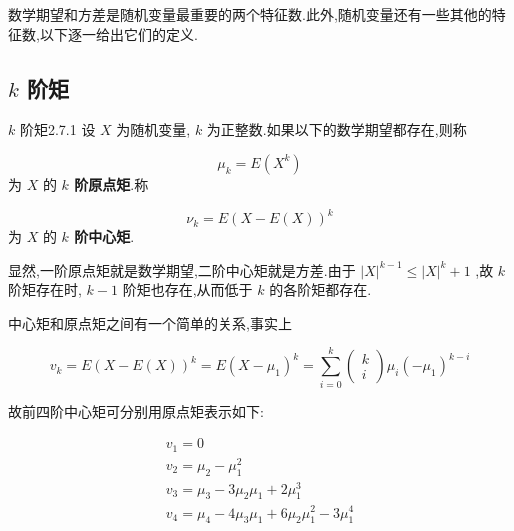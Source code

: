 数学期望和方差是随机变量最重要的两个特征数.此外,随机变量还有一些其他的特征数,以下逐一给出它们的定义.

\subsection{$ k $ 阶矩}\label{ssec:2.7.1}

\begin{definition}{$ k $ 阶矩}{2.7.1}
	设 $ X $ 为随机变量, $ k $ 为正整数.如果以下的数学期望都存在,则称
	
	\begin{equation}
	\mu_{k}=E\left(X^{k}\right) \label{eq:2.7.1}
	\end{equation}
	为 $ X $ 的 \textbf{ $ k $ 阶原点矩}.称
	
	\begin{equation}
	\nu_{k}=E(X-E(X))^{k} \label{eq:2.7.2}
	\end{equation}
	为 $ X $ 的 \textbf{ $ k $ 阶中心矩}.
\end{definition}


显然,一阶原点矩就是数学期望,二阶中心矩就是方差.由于 $ |X|^{k-1} \leqslant |X|^{k}+1 $ ,故 $ k $ 阶矩存在时, $ k-1 $ 阶矩也存在,从而低于 $ k $ 的各阶矩都存在.

中心矩和原点矩之间有一个简单的关系,事实上

\[
v_{k}=E(X-E(X))^{k}=E\left(X-\mu_{1}\right)^{k}=\sum_{i=0}^{k} \left( \begin{array}{l}{k} \\ {i}\end{array}\right) \mu_{i}\left(-\mu_{1}\right)^{k-i}
\]

故前四阶中心矩可分别用原点矩表示如下:

\[
\begin{array}{l}{v_{1}=0} \\ {v_{2}=\mu_{2}-\mu_{1}^{2}} \\ {v_{3}=\mu_{3}-3 \mu_{2} \mu_{1}+2 \mu_{1}^{3}} \\ {v_{4}=\mu_{4}-4 \mu_{3} \mu_{1}+6 \mu_{2} \mu_{1}^{2}-3 \mu_{1}^{4}}\end{array}
\]

